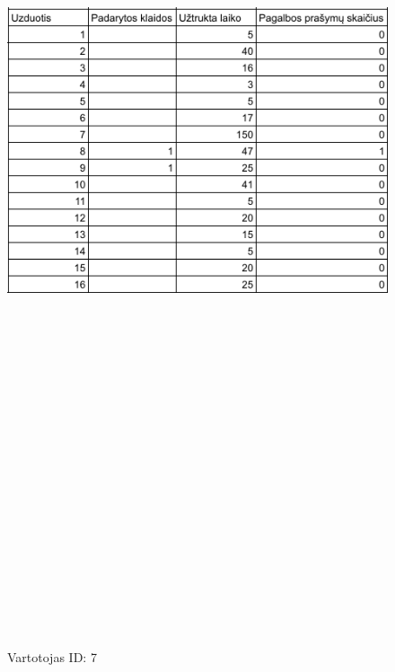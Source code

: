 \documentclass[oneside]{VUMIFPSkursinis}
\begin{document}
	\begin{figure}[h]
			\centering
			\includegraphics[width=15cm,height=60cm,keepaspectratio]{7.png}
			\caption{ Vartotojas ID: 7}
	\end{figure}
\end{document}
